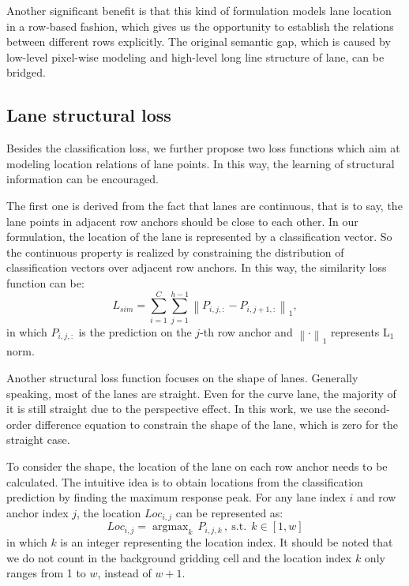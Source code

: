 \documentclass[runningheads]{llncs}
\DeclareMathOperator*{\argmax}{argmax}
\begin{document}
Another significant benefit is that this kind of formulation models lane location in a row-based fashion, which gives us the opportunity to establish the relations between different rows explicitly. The original semantic gap, which is caused by low-level pixel-wise modeling and high-level long line structure of lane, can be bridged.



\subsection{Lane structural loss}
\label{sec_loss}


Besides the classification loss, we further propose two loss functions which aim at modeling location relations of lane points. In this way, the learning of structural information can be encouraged.

The first one is derived from the fact that lanes are continuous, that is to say, the lane points in adjacent row anchors should be close to each other. In our formulation, the location of the lane is represented by a classification vector. So the continuous property is realized by constraining the distribution of classification vectors over adjacent row anchors. In this way, the similarity loss function can be:
\begin{equation}
L_{sim}=\sum_{i=1}^{C} \sum_{j=1}^{h-1} \left \| P_{i,j,:} - P_{i,j+1,:} \right \|_1,
\label{eq_sim}
\end{equation}
in which $P_{i,j,:}$ is the prediction on the $j$-th row anchor and $\left \| \cdot \right \|_1$ represents L$_1$ norm.

Another structural loss function focuses on the shape of lanes. Generally speaking, most of the lanes are straight. Even for the curve lane, the majority of it is still straight due to the perspective effect. In this work, we use the second-order difference equation to constrain the shape of the lane, which is zero for the straight case.

To consider the shape, the location of the lane on each row anchor needs to be calculated. The intuitive idea is to obtain locations from the classification prediction by finding the maximum response peak. For any lane index $i$ and row anchor index $j$, the location $Loc_{i,j}$ can be represented as:
\begin{equation}
Loc_{i,j} = \argmax_k \, P_{i,j,k} \,, \  \text{s.t.} \ \   k \in [1,w]  
\label{eq_argmax}
\end{equation}
in which $k$ is an integer representing the location index. It should be noted that we do not count in the background gridding cell and the location index $k$ only ranges from 1 to $w$, instead of $w+1$. 
\end{document}
